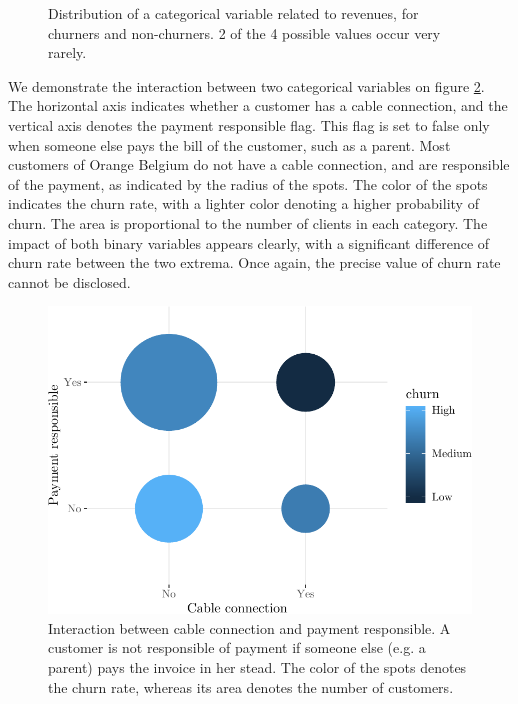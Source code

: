 \begin{figure}
\begin{minipage}{.45\textwidth}
    	\caption{Distribution of a categorical variable related to revenues, for
    	churners and non-churners. 2 of the 4 possible values occur very
    	rarely.}
    	\label{fig:categorical}
    \end{minipage}
\end{figure}


We demonstrate the interaction between two categorical variables on figure
\ref{fig:binary_payment_responsible}. The horizontal axis indicates whether a
customer has a cable connection, and the vertical axis denotes the payment
responsible flag. This flag is set to false only when someone else pays the bill
of the customer, such as a parent. Most customers of Orange Belgium do not have
a cable connection, and are responsible of the payment, as indicated by the
radius of the spots. The color of the spots indicates the churn rate, with a
lighter color denoting a higher probability of churn. The area is proportional
to the number of clients in each category. The impact of both binary variables
appears clearly, with a significant difference of churn rate between the two
extrema. Once again, the precise value of churn rate cannot be disclosed.


\begin{figure}
    \centering
	\includegraphics[width=0.9\linewidth]{figures/flagcable_payment_responsible.pdf}
	\caption{Interaction between cable connection and payment responsible. A
	customer is not responsible of payment if someone else (e.g. a parent) pays
	the invoice in her stead. The color of the spots denotes the churn rate,
	whereas its area denotes the number of customers.}
	\label{fig:binary_payment_responsible}
\end{figure}


